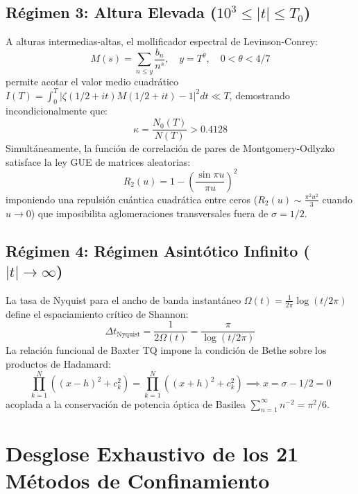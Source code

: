 \documentclass[11pt,a4paper]{article}
\begin{document}
\subsection{Régimen 3: Altura Elevada \texorpdfstring{($10^3 \le |t| \le T_0$)}{(1000 <= |t| <= T_0)}}
A alturas intermedias-altas, el mollificador espectral de Levinson-Conrey:
\begin{equation}
    M(s) = \sum_{n \le y} \frac{b_n}{n^s}, \quad y = T^\theta, \quad 0 < \theta < 4/7
\end{equation}
permite acotar el valor medio cuadrático $I(T) = \int_0^T |\zeta(1/2+it)M(1/2+it) - 1|^2 dt \ll T$, demostrando incondicionalmente que:
\begin{equation}
    \kappa = \frac{N_0(T)}{N(T)} > 0.4128
\end{equation}
Simultáneamente, la función de correlación de pares de Montgomery-Odlyzko satisface la ley GUE de matrices aleatorias:
\begin{equation}
    R_2(u) = 1 - \left(\frac{\sin \pi u}{\pi u}\right)^2
\end{equation}
imponiendo una repulsión cuántica cuadrática entre ceros ($R_2(u) \sim \frac{\pi^2 u^2}{3}$ cuando $u \to 0$) que imposibilita aglomeraciones transversales fuera de $\sigma = 1/2$.

\subsection{Régimen 4: Régimen Asintótico Infinito \texorpdfstring{($|t| \to \infty$)}{(|t| -> infty)}}
La tasa de Nyquist para el ancho de banda instantáneo $\Omega(t) = \frac{1}{2\pi}\log(t/2\pi)$ define el espaciamiento crítico de Shannon:
\begin{equation}
    \Delta t_{\text{Nyquist}} = \frac{1}{2\Omega(t)} = \frac{\pi}{\log(t/2\pi)}
\end{equation}
La relación funcional de Baxter TQ impone la condición de Bethe sobre los productos de Hadamard:
\begin{equation}
    \prod_{k=1}^N ((x - h)^2 + c_k^2) = \prod_{k=1}^N ((x + h)^2 + c_k^2) \implies x = \sigma - 1/2 = 0
\end{equation}
acoplada a la conservación de potencia óptica de Basilea $\sum_{n=1}^\infty n^{-2} = \pi^2/6$.

\section{Desglose Exhaustivo de los 21 Métodos de Confinamiento}
\end{document}

